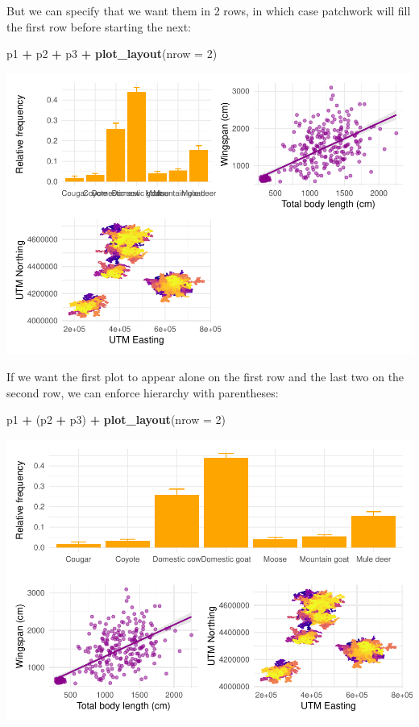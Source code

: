 \documentclass[
]{book}
\newenvironment{Shaded}{\begin{snugshade}}{\end{snugshade}}
\newcommand{\AttributeTok}[1]{\textcolor[rgb]{0.13,0.29,0.53}{#1}}
\newcommand{\DecValTok}[1]{\textcolor[rgb]{0.00,0.00,0.81}{#1}}
\newcommand{\FunctionTok}[1]{\textcolor[rgb]{0.13,0.29,0.53}{\textbf{#1}}}
\newcommand{\NormalTok}[1]{#1}
\newcommand{\SpecialCharTok}[1]{\textcolor[rgb]{0.81,0.36,0.00}{\textbf{#1}}}
\begin{document}
But we can specify that we want them in 2 rows, in which case patchwork will
fill the first row before starting the next:

\begin{Shaded}
\begin{Highlighting}[]
\NormalTok{p1 }\SpecialCharTok{+}\NormalTok{ p2 }\SpecialCharTok{+}\NormalTok{ p3 }\SpecialCharTok{+} \FunctionTok{plot\_layout}\NormalTok{(}\AttributeTok{nrow =} \DecValTok{2}\NormalTok{)}
\end{Highlighting}
\end{Shaded}

\includegraphics{reproducible-science_files/figure-latex/gg36-1.pdf}

If we want the first plot to appear alone on the first row and the last two on
the second row, we can enforce hierarchy with parentheses:

\begin{Shaded}
\begin{Highlighting}[]
\NormalTok{p1 }\SpecialCharTok{+}\NormalTok{ (p2 }\SpecialCharTok{+}\NormalTok{ p3) }\SpecialCharTok{+} \FunctionTok{plot\_layout}\NormalTok{(}\AttributeTok{nrow =} \DecValTok{2}\NormalTok{)}
\end{Highlighting}
\end{Shaded}

\includegraphics{reproducible-science_files/figure-latex/gg37-1.pdf}
\end{document}
